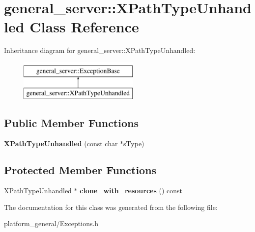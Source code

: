 \hypertarget{classgeneral__server_1_1XPathTypeUnhandled}{\section{general\-\_\-server\-:\-:\-X\-Path\-Type\-Unhandled \-Class \-Reference}
\label{classgeneral__server_1_1XPathTypeUnhandled}
}
\-Inheritance diagram for general\-\_\-server\-:\-:\-X\-Path\-Type\-Unhandled\-:\begin{figure}[H]
\begin{center}
\leavevmode
\includegraphics[height=2.000000cm]{classgeneral__server_1_1XPathTypeUnhandled}
\end{center}
\end{figure}
\subsection*{\-Public \-Member \-Functions}
\begin{DoxyCompactItemize}
\item 
\hypertarget{classgeneral__server_1_1XPathTypeUnhandled_aa6a00328537006e7afbbaca7b81767b9}{{\bfseries \-X\-Path\-Type\-Unhandled} (const char $\ast$s\-Type)}\label{classgeneral__server_1_1XPathTypeUnhandled_aa6a00328537006e7afbbaca7b81767b9}

\end{DoxyCompactItemize}
\subsection*{\-Protected \-Member \-Functions}
\begin{DoxyCompactItemize}
\item 
\hypertarget{classgeneral__server_1_1XPathTypeUnhandled_a90f2bd79247f7072890407f302cf6df3}{\hyperlink{classgeneral__server_1_1XPathTypeUnhandled}{\-X\-Path\-Type\-Unhandled} $\ast$ {\bfseries clone\-\_\-with\-\_\-resources} () const }\label{classgeneral__server_1_1XPathTypeUnhandled_a90f2bd79247f7072890407f302cf6df3}

\end{DoxyCompactItemize}


\-The documentation for this class was generated from the following file\-:\begin{DoxyCompactItemize}
\item 
platform\-\_\-general/\-Exceptions.\-h\end{DoxyCompactItemize}
